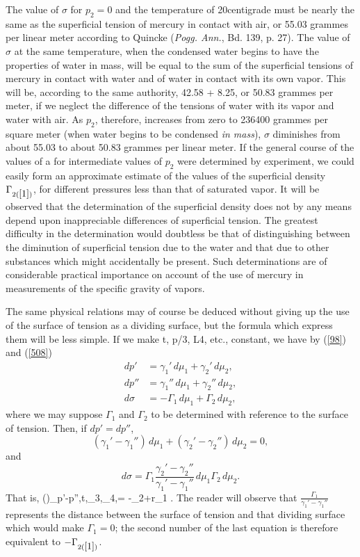 \documentclass[12pt]{article}
\begin{document}
{{The value of $\sigma$ for $p_2=0$ and the temperature of 20\degree  centigrade must be nearly the same as the superficial tension of mercury in contact with air, or 55.03 grammes per linear meter according to Quincke (\textit{Pogg. Ann.}, Bd. 139, p. 27). The value of $\sigma$ at the same temperature, when the condensed water begins to have the properties of water in mass, will be equal to the sum of the superficial tensions of mercury in contact with water and of water in contact with its own vapor. This will be, according to the same authority, 42.58 + 8.25, or 50.83 grammes per meter, if we neglect the difference of the tensions of water with its vapor and water with air. As $p_2$, therefore, increases from zero to 236400 grammes per square meter (when water begins to be condensed \textit{in mass}), $\sigma$ diminishes from about 55.03 to about 50.83 grammes per linear meter. If the general course of the values of a for intermediate values of $p_2$ were determined by experiment, we could easily form an approximate estimate of the values of the superficial density $\Gamma_{2(\ref{1})}$, for different pressures less than that of saturated vapor. It will be observed that the determination of the superficial density does not by any means depend upon inappreciable differences of superficial tension. The greatest difficulty in the determination would doubtless be that of distinguishing between the diminution of superficial tension due to the water and that due to other substances which might accidentally be present. Such determinations are of considerable practical importance on account of the use of mercury in measurements of the specific gravity of vapors.}

The same physical relations may of course be deduced without giving up the use of the surface of tension as a dividing surface, but the formula which express them will be less simple. If we make t, p/3, L4, etc., constant, we have by (\ref{98}) and (\ref{508})
\begin{align*}dp' &= \gamma_1'\, d\mu_1 + \gamma_2'\, d\mu_2, \\
dp'' &= \gamma_1''\, d\mu_1 + \gamma_2''\, d\mu_2, \\
d\sigma &= -\Gamma_1\, d\mu_1 + \Gamma_2\, d\mu_2,\end{align*}
where we may suppose $\Gamma_1$ and $\Gamma_2$ to be determined with reference to the surface of tension. Then, if $dp'=dp''$,
$$ (\gamma_1' - \gamma_1'')\, d\mu_1 + (\gamma_2' - \gamma_2'')\, d\mu_2  = 0, $$
and
$$ d\sigma = \Gamma_1 \frac{\gamma_2' - \gamma_2''}{\gamma_1' - \gamma_1''}\, d\mu_1   \Gamma_2\, d\mu_2.$$
That is,
\eqs \left(\right)_{p'-p'',t,\mu_3,\mu_4,}= -\Gamma_2+r\Gamma_1 . \label{515}\eqe
The reader will observe that $\frac{\Gamma_1}{\gamma_1' - \gamma_1''}$ represents the distance between the surface of tension and that dividing surface which would make $\Gamma_1 =0$; the second number of the last equation is therefore equivalent to $- \Gamma_{2(\ref{1})}$.

}
\end{document}
